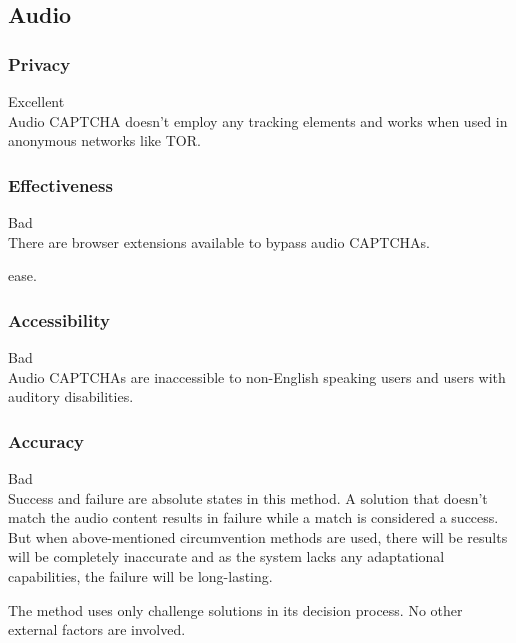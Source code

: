 \subsection{Audio}

\subsubsection{Privacy}
Excellent\\
Audio CAPTCHA doesn't employ any tracking elements and works when used in anonymous
networks like TOR\@.

\subsubsection{Effectiveness}
Bad\\

There are browser extensions available to bypass audio CAPTCHAs.

ease.
\subsubsection{Accessibility}
Bad\\

Audio CAPTCHAs are inaccessible to non-English speaking users and users with
auditory disabilities.

\subsubsection{Accuracy}
Bad\\

Success and failure are absolute states in this method. A solution that doesn't
match the audio content results in failure while a match is considered a
success. But when above-mentioned circumvention methods are used, there will be
results will be completely inaccurate and as the system lacks any adaptational
capabilities, the failure will be long-lasting.  

The method uses only challenge solutions in its decision process. No other
external factors are involved.
